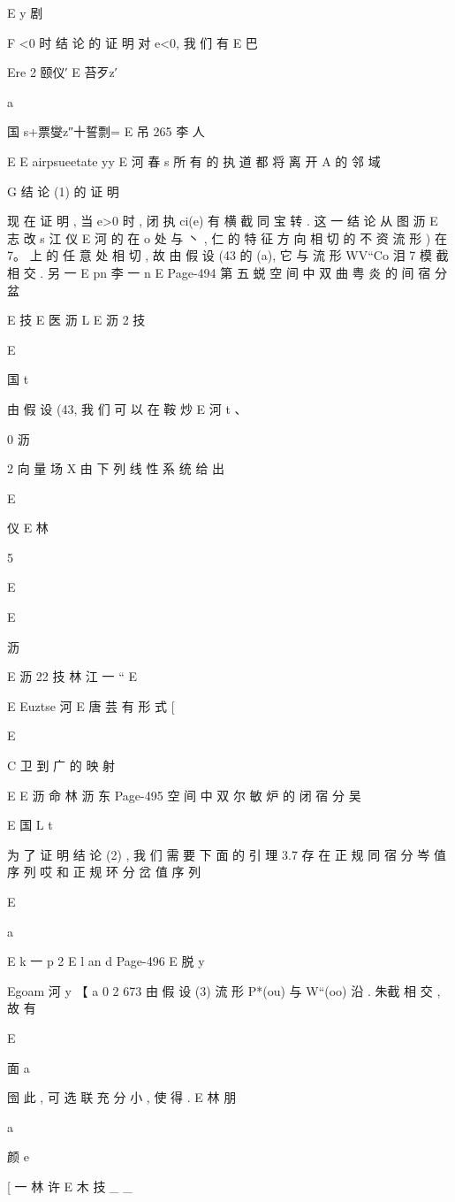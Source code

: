 {{{{E y 剧

F <0 时 结 论 的 证 明
对 e<0, 我 们 有
E 巴

Ere 2 颐仪′ E 苔歹z′

a

国 s+票燮z″十誓剽= E 吊 265 李 人

E
E airpsueetate yy E 河 春
s
所 有 的 执 道 都 将 离 开 A 的 邻 域

G 结 论 (1) 的 证 明

现 在 证 明 , 当 e>0 时 , 闭 执 ci(e) 有 横 截 同 宝 转 . 这 一 结 论 从 图
沥
E 志 改 s 江 仪
E 河
的 在 o 处 与 丶 , 仁 的 特 征 方 向 相 切 的 不 资 流 形 ) 在 7。 上 的 任 意
处 相 切 , 故 由 假 设 (43 的 (a), 它 与 流 形 WV“Co 泪 7 模 截 相 交 . 另 一
E pn 李 一
n
E
Page-494
第 五 蜕 空 间 中 双 曲 粤 炎 的 间 宿 分 盆

E 技
E
医 沥 L
E 沥 2 技

E

国 t

由 假 设 (43, 我 们 可 以 在 鞍 炒 %
E 河 t 、

0 沥

2 向 量 场 X 由 下 列 线 性 系 统 给 出

E
{仪 E 林

5

E

E

沥

E 沥 22 技 林 江 一 “
E

E
Euztse 河 E 唐 芸
有 形 式
[

E

C 卫 到 广 的 映 射

E
E 沥 命 林 沥 东
Page-495
空 间 中 双 尔 敏 炉 的 闭 宿 分 吴

E 国 L t

为 了 证 明 结 论 (2) , 我 们 需 要 下 面 的
引 理 3.7 存 在 正 规 同 宿 分 岑 值 序 列 哎 和 正 规 环 分 岔 值 序 列

E

a

E k 一 p 2
E l an
d
Page-496
E 脱 y

Egoam 河 y
【 a 0 2 673
由 假 设 (3) 流 形 P*(ou) 与 W“(oo) 沿 . 朱截 相 交 , 故 有

E

面 a

囹 此 , 可 选 联 充 分 小 , 使 得 .
E 林 朋

a

颜 e

[ 一 林 许
E 木
技 _ _

}}}}}
